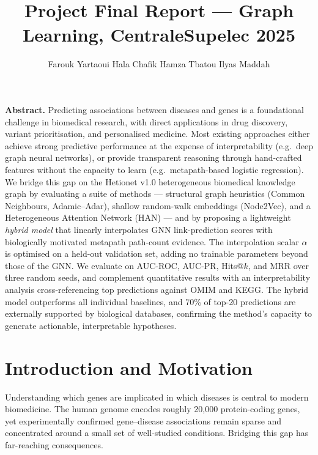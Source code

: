 \documentclass[10pt,a4paper,twocolumn]{article}
\title{\vspace{-1.2cm}{\large\bfseries Interpretable Disease--Gene Prediction via\\
Hybrid Graph Learning and Metapath Reasoning}\\[4pt]
{\small Project Final Report --- Graph Learning, CentraleSupelec 2025}}
\author{\small Farouk Yartaoui \quad Hala Chafik \quad Hamza Tbatou \quad Ilyas Maddah}
\date{}
\begin{document}
\maketitle\thispagestyle{fancy}
\vspace{-10pt}

\begin{mdframed}[backgroundcolor=boxgray, linewidth=0pt,
  innerleftmargin=6pt, innerrightmargin=6pt,
  innertopmargin=5pt, innerbottommargin=5pt]
\small\textbf{Abstract.}
Predicting associations between diseases and genes is a foundational challenge
in biomedical research, with direct applications in drug discovery, variant
prioritisation, and personalised medicine. Most existing approaches either
achieve strong predictive performance at the expense of interpretability (e.g.\
deep graph neural networks), or provide transparent reasoning through
hand-crafted features without the capacity to learn (e.g.\ metapath-based
logistic regression). We bridge this gap on the Hetionet v1.0 heterogeneous
biomedical knowledge graph by evaluating a suite of methods --- structural graph
heuristics (Common Neighbours, Adamic--Adar), shallow random-walk embeddings
(Node2Vec), and a Heterogeneous Attention Network (HAN) --- and by proposing a
lightweight \emph{hybrid model} that linearly interpolates GNN link-prediction
scores with biologically motivated metapath path-count evidence. The
interpolation scalar $\alpha$ is optimised on a held-out validation set, adding
no trainable parameters beyond those of the GNN. We evaluate on AUC-ROC,
AUC-PR, Hits@$k$, and MRR over three random seeds, and complement quantitative
results with an interpretability analysis cross-referencing top predictions
against OMIM and KEGG. The hybrid model outperforms all individual baselines,
and 70\% of top-20 predictions are externally supported by biological databases,
confirming the method's capacity to generate actionable, interpretable
hypotheses.
\end{mdframed}

\section{Introduction and Motivation}
\label{sec:intro}

Understanding which genes are implicated in which diseases is central to modern
biomedicine. The human genome encodes roughly 20{,}000 protein-coding genes, yet
experimentally confirmed gene--disease associations remain sparse and
concentrated around a small set of well-studied conditions. Bridging this gap
has far-reaching consequences.
\end{document}
